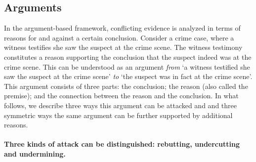 \documentclass[10pt]{article}
\begin{document}


\subsection{Arguments}
\label{sec:confArg}


In the argument-based framework, conflicting evidence is analyzed 
in terms of reasons for and against a certain conclusion. Consider a crime case, where a witness testifies she saw the 
suspect at the crime scene. The witness testimony constitutes a reason supporting the conclusion 
that the suspect indeed was at the crime scene. This can be understood as 
an argument \textit{from} `a witness testified she saw the suspect at the crime scene' \textit{to} 
`the suspect was in fact at the crime scene'.
This argument consists of three parts: the conclusion; the reason (also called the premise); and the connection between the reason and the conclusion.
In what follows, we describe three ways 
this argument can be attacked and and three symmetric 
ways the same argument can be further supported by additional reasons. 


\paragraph{Three kinds of attack can be distinguished: rebutting, undercutting and undermining.}
\end{document}
